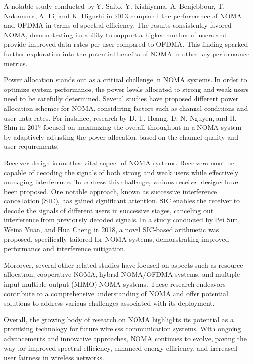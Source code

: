 \documentclass[conference]{IEEEtran}
\begin{document}
A notable study conducted by Y. Saito, Y. Kishiyama, A. Benjebbour, T. Nakamura, A. Li, and K. Higuchi in 2013 compared the performance of NOMA and OFDMA in terms of spectral efficiency. The results consistently favored NOMA, demonstrating its ability to support a higher number of users and provide improved data rates per user compared to OFDMA. This finding sparked further exploration into the potential benefits of NOMA in other key performance metrics.

Power allocation stands out as a critical challenge in NOMA systems. In order to optimize system performance, the power levels allocated to strong and weak users need to be carefully determined. Several studies have proposed different power allocation schemes for NOMA, considering factors such as channel conditions and user data rates. For instance, research by D. T. Hoang, D. N. Nguyen, and H. Shin in 2017 focused on maximizing the overall throughput in a NOMA system by adaptively adjusting the power allocation based on the channel quality and user requirements.

Receiver design is another vital aspect of NOMA systems. Receivers must be capable of decoding the signals of both strong and weak users while effectively managing interference. To address this challenge, various receiver designs have been proposed. One notable approach, known as successive interference cancellation (SIC), has gained significant attention. SIC enables the receiver to decode the signals of different users in successive stages, canceling out interference from previously decoded signals. In a study conducted by Pei Sun, Weina Yuan, and Hua Cheng in 2018, a novel SIC-based arithmetic was proposed, specifically tailored for NOMA systems, demonstrating improved performance and interference mitigation.

Moreover, several other related studies have focused on aspects such as resource allocation, cooperative NOMA, hybrid NOMA/OFDMA systems, and multiple-input multiple-output (MIMO) NOMA systems. These research endeavors contribute to a comprehensive understanding of NOMA and offer potential solutions to address various challenges associated with its deployment.

Overall, the growing body of research on NOMA highlights its potential as a promising technology for future wireless communication systems. With ongoing advancements and innovative approaches, NOMA continues to evolve, paving the way for improved spectral efficiency, enhanced energy efficiency, and increased user fairness in wireless networks.
\end{document}

